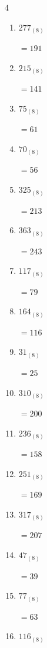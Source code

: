 \begin{multicols}{4}
\begin{enumerate}
        $=67$

\columnbreak %

  \item $277_{(8)}$

        $=191$

  \item $215_{(8)}$

        $=141$

  \item $75_{(8)}$

        $=61$

  \item $70_{(8)}$

        $=56$

  \item $325_{(8)}$

        $=213$

  \item $363_{(8)}$

        $=243$

  \item $117_{(8)}$

        $=79$

  \item $164_{(8)}$

        $=116$

  \item $31_{(8)}$

        $=25$

  \item $310_{(8)}$

        $=200$

  \item $236_{(8)}$

        $=158$

  \item $251_{(8)}$

        $=169$

  \item $317_{(8)}$

        $=207$

  \item $47_{(8)}$

        $=39$

  \item $77_{(8)}$

        $=63$

\columnbreak %

  \item $116_{(8)}$


\end{enumerate}
\end{multicols}

